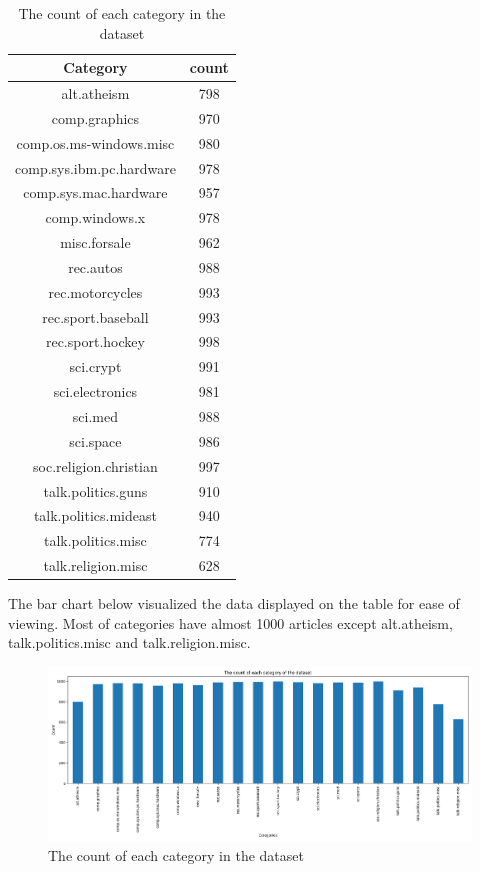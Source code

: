 \begin{table} [ht]
	\centering
	\begin{tabular} {|| c | c ||}
		\hline
		Category & count \\ [0.5ex]
		\hline\hline
		alt.atheism & 798 \\
		comp.graphics & 970 \\
		comp.os.ms-windows.misc & 980 \\
		comp.sys.ibm.pc.hardware & 978 \\
		comp.sys.mac.hardware & 957 \\
		comp.windows.x & 978 \\
		misc.forsale & 962 \\
		rec.autos & 988 \\
		rec.motorcycles & 993 \\
		rec.sport.baseball & 993 \\
		rec.sport.hockey & 998 \\
		sci.crypt & 991 \\
		sci.electronics & 981 \\
		sci.med & 988 \\
		sci.space & 986 \\
		soc.religion.christian & 997 \\
		talk.politics.guns & 910 \\
		talk.politics.mideast & 940 \\
		talk.politics.misc & 774 \\
		talk.religion.misc & 628 \\
		\hline
	\end{tabular}
	\caption{The count of each category in the dataset}
	\label{tbl:freqCount}
\end{table}


The bar chart below visualized the data displayed on the table for ease of viewing. Most of categories have almost 1000 articles except alt.atheism, talk.politics.misc and talk.religion.misc.

\begin{figure} [ht]
	\centering
	\includegraphics[width=\textwidth]{count}
	\caption{The count of each category in the dataset}
	\label{fig:freqCount}
\end{figure}


